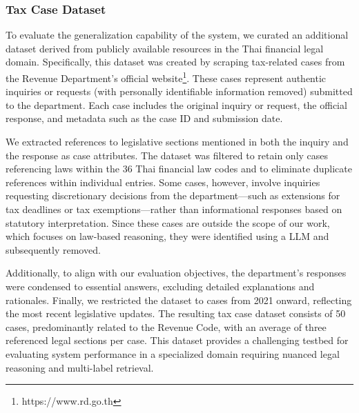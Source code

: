 \subsubsection{Tax Case Dataset}
\label{subsubsec:tax_dataset}

To evaluate the generalization capability of the system, we curated an additional dataset derived from publicly available resources in the Thai financial legal domain. Specifically, this dataset was created by scraping tax-related cases from the Revenue Department's official website\footnote{https://www.rd.go.th}. These cases represent authentic inquiries or requests (with personally identifiable information removed) submitted to the department. Each case includes the original inquiry or request, the official response, and metadata such as the case ID and submission date.

We extracted references to legislative sections mentioned in both the inquiry and the response as case attributes. The dataset was filtered to retain only cases referencing laws within the 36 Thai financial law codes and to eliminate duplicate references within individual entries. Some cases, however, involve inquiries requesting discretionary decisions from the department—such as extensions for tax deadlines or tax exemptions—rather than informational responses based on statutory interpretation. Since these cases are outside the scope of our work, which focuses on law-based reasoning, they were identified using a LLM and subsequently removed.

Additionally, to align with our evaluation objectives, the department's responses were condensed to essential answers, excluding detailed explanations and rationales. Finally, we restricted the dataset to cases from 2021 onward, reflecting the most recent legislative updates. The resulting tax case dataset consists of 50 cases, predominantly related to the Revenue Code, with an average of three referenced legal sections per case. This dataset provides a challenging testbed for evaluating system performance in a specialized domain requiring nuanced legal reasoning and multi-label retrieval.


